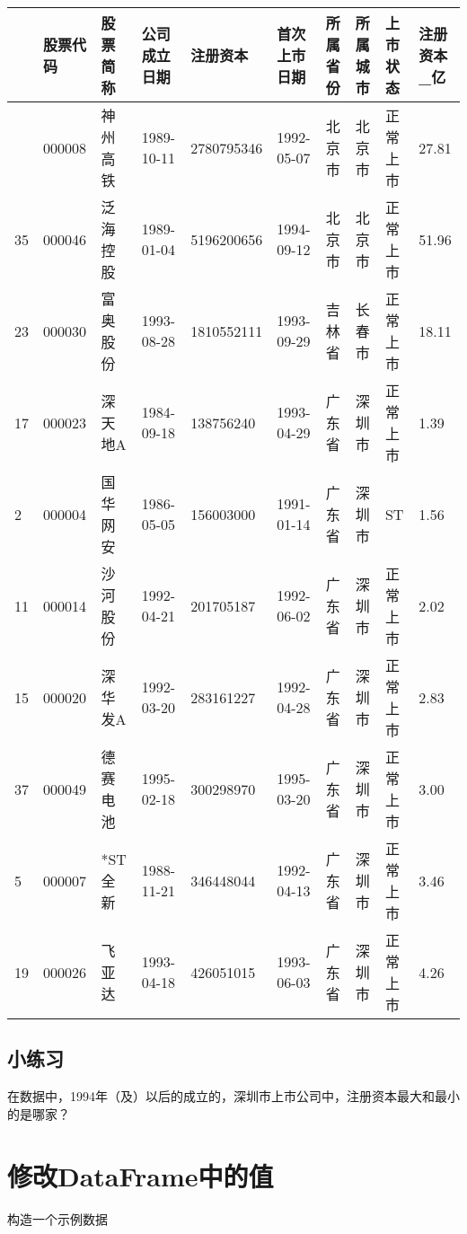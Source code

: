 \documentclass[
  letterpaper,
  DIV=11,
  numbers=noendperiod]{scrreprt}
\begin{document}
\begin{longtable}[]{@{}llllllllll@{}}
\toprule\noalign{}
& 股票代码 & 股票简称 & 公司成立日期 & 注册资本 & 首次上市日期 &
所属省份 & 所属城市 & 上市状态 & 注册资本\_亿 \\
\midrule\noalign{}
\endhead
\bottomrule\noalign{}
\endlastfoot
6 & 000008 & 神州高铁 & 1989-10-11 & 2780795346 & 1992-05-07 & 北京市 &
北京市 & 正常上市 & 27.81 \\
35 & 000046 & 泛海控股 & 1989-01-04 & 5196200656 & 1994-09-12 & 北京市 &
北京市 & 正常上市 & 51.96 \\
23 & 000030 & 富奥股份 & 1993-08-28 & 1810552111 & 1993-09-29 & 吉林省 &
长春市 & 正常上市 & 18.11 \\
17 & 000023 & 深天地A & 1984-09-18 & 138756240 & 1993-04-29 & 广东省 &
深圳市 & 正常上市 & 1.39 \\
2 & 000004 & 国华网安 & 1986-05-05 & 156003000 & 1991-01-14 & 广东省 &
深圳市 & ST & 1.56 \\
11 & 000014 & 沙河股份 & 1992-04-21 & 201705187 & 1992-06-02 & 广东省 &
深圳市 & 正常上市 & 2.02 \\
15 & 000020 & 深华发A & 1992-03-20 & 283161227 & 1992-04-28 & 广东省 &
深圳市 & 正常上市 & 2.83 \\
37 & 000049 & 德赛电池 & 1995-02-18 & 300298970 & 1995-03-20 & 广东省 &
深圳市 & 正常上市 & 3.00 \\
5 & 000007 & *ST 全新 & 1988-11-21 & 346448044 & 1992-04-13 & 广东省 &
深圳市 & 正常上市 & 3.46 \\
19 & 000026 & 飞亚达 & 1993-04-18 & 426051015 & 1993-06-03 & 广东省 &
深圳市 & 正常上市 & 4.26 \\
\end{longtable}

\hypertarget{ux5c0fux7ec3ux4e60-5}{%
\subsection{小练习}\label{ux5c0fux7ec3ux4e60-5}}

在数据中，1994年（及）以后的成立的，深圳市上市公司中，注册资本最大和最小的是哪家？

\hypertarget{ux4feeux6539dataframeux4e2dux7684ux503c}{%
\section{修改DataFrame中的值}\label{ux4feeux6539dataframeux4e2dux7684ux503c}}

构造一个示例数据
\end{document}
